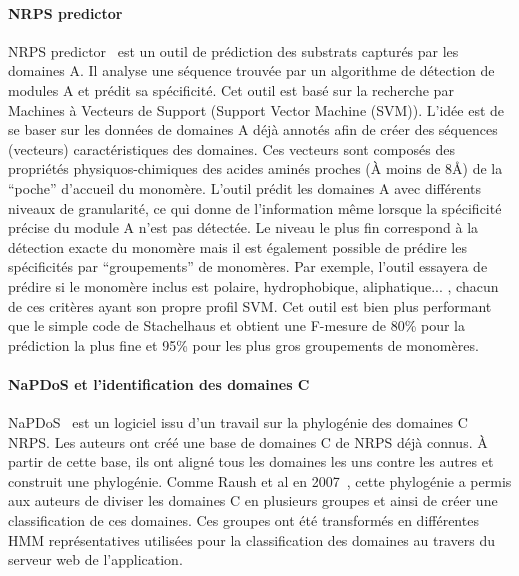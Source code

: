 \documentclass[12pt,french,twoside]{report}
\begin{document}
\paragraph{NRPS predictor}
NRPS predictor~\cite{rottig_nrpspredictor2web_2011,rausch_specificity_2005} est un outil de prédiction des substrats capturés par les domaines A.
Il analyse une séquence trouvée par un algorithme de détection de modules A et prédit sa spécificité.
Cet outil est basé sur la recherche par Machines à Vecteurs de Support (Support Vector Machine (SVM)).
L'idée est de se baser sur les données de domaines A déjà annotés afin de créer des séquences (vecteurs) caractéristiques des domaines.
Ces vecteurs sont composés des propriétés physiquos-chimiques des acides aminés proches (À moins de 8Å) de la ``poche'' d'accueil du monomère.
L'outil prédit les domaines A avec différents niveaux de granularité, ce qui donne de l'information même lorsque la spécificité précise du module A n'est pas détectée.
Le niveau le plus fin correspond à la détection exacte du monomère mais il est également possible de prédire les spécificités par ``groupements'' de monomères.
Par exemple, l'outil essayera de prédire si le monomère inclus est polaire, hydrophobique, aliphatique... , chacun de ces critères ayant son propre profil SVM.
Cet outil est bien plus performant que le simple code de Stachelhaus et obtient une F-mesure de 80\% pour la prédiction la plus fine et 95\% pour les plus gros groupements de monomères.


\paragraph{NaPDoS et l'identification des domaines C}
NaPDoS~\cite{ziemert_natural_2012} est un logiciel issu d'un travail sur la phylogénie des domaines C NRPS.
Les auteurs ont créé une base de domaines C de NRPS déjà connus.
À partir de cette base, ils ont aligné tous les domaines les uns contre les autres et construit une phylogénie.
Comme Raush et al en 2007~\cite{rausch_phylogenetic_2007}, cette phylogénie a permis aux auteurs de diviser les domaines C en plusieurs groupes et ainsi de créer une classification de ces domaines.
Ces groupes ont été transformés en différentes HMM représentatives utilisées pour la classification des domaines au travers du serveur web de l'application.


\end{document}
